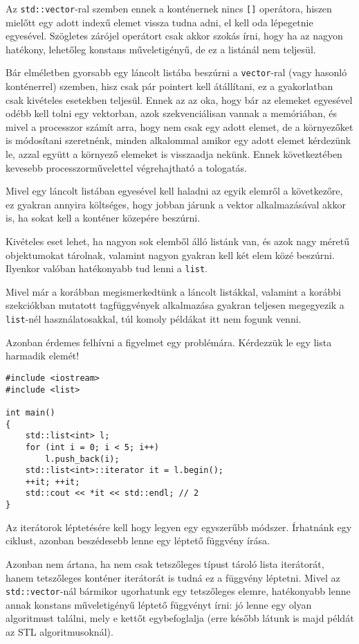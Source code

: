 \documentclass[../cpp_book/cpp_book.tex]{subfiles}
\begin{document}
	Az \texttt{std::vector}-ral szemben ennek a konténernek nincs \texttt{[]} operátora, hiszen mielőtt egy adott indexű elemet vissza tudna adni, el kell oda lépegetnie egyesével. Szögletes zárójel operátort csak akkor szokás írni, hogy ha az nagyon hatékony, lehetőleg konstans műveletigényű, de ez a listánál nem teljesül.
	\begin{note}
		Bár elméletben gyorsabb egy láncolt listába beszúrni a \texttt{vector}-ral (vagy hasonló konténerrel) szemben, hisz csak pár pointert kell átállítani, ez a gyakorlatban csak kivételes esetekben teljesül. Ennek az az oka, hogy bár az elemeket egyesével odébb kell tolni egy vektorban, azok szekvenciálisan vannak a memóriában, és mivel a processzor számít arra, hogy nem csak egy adott elemet, de a környezőket is módosítani szeretnénk, minden alkalommal amikor egy adott elemet kérdezünk le, azzal együtt a környező elemeket is visszaadja nekünk. Ennek következtében kevesebb processzorművelettel végrehajtható a tologatás.
		
		Mivel egy láncolt listában egyesével kell haladni az egyik elemről a következőre, ez gyakran annyira költséges, hogy jobban járunk a vektor alkalmazásával akkor is, ha sokat kell a konténer közepére beszúrni.
		
		Kivételes eset lehet, ha nagyon sok elemből álló listánk van, és azok nagy méretű objektumokat tárolnak, valamint nagyon gyakran kell két elem közé beszúrni. Ilyenkor valóban hatékonyabb tud lenni a \texttt{list}.
	\end{note}
	Mivel már a korábban megismerkedtünk a láncolt listákkal, valamint a korábbi szekciókban mutatott tagfüggvények alkalmazása gyakran teljesen megegyezik a \texttt{list}-nél használatosakkal, túl komoly példákat itt nem fogunk venni. 
	
	Azonban érdemes felhívni a figyelmet egy problémára. Kérdezzük le egy lista harmadik elemét!
	\begin{lstlisting}
#include <iostream>
#include <list>

int main()
{
	std::list<int> l;
	for (int i = 0; i < 5; i++)
		l.push_back(i);
	std::list<int>::iterator it = l.begin();
	++it; ++it;
	std::cout << *it << std::endl; // 2
}
	\end{lstlisting}	
	Az iterátorok léptetésére kell hogy legyen egy egyszerűbb módszer. Írhatnánk egy ciklust, azonban beszédesebb lenne egy léptető függvény írása.
	
	Azonban nem ártana, ha nem csak tetszőleges típust tároló lista iterátorát, hanem tetszőleges konténer iterátorát is tudná ez a függvény léptetni. Mivel az \texttt{std::vector}-nál bármikor ugorhatunk egy tetszőleges elemre, hatékonyabb lenne annak konstans műveletigényű léptető függvényt írni: jó lenne egy olyan algoritmust találni, mely e kettőt egybefoglalja (erre később látunk is majd példát az STL algoritmusoknál).
	
\end{document}
